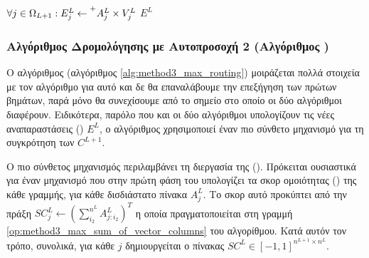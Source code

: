 {\begin{algorithm}[H]
\begin{algorithmic}[1]
      
    \State $\forall j \in \Omega_{L+1}: E^L_j \gets \prescript{+}{}{A_j^L} \times V_j^L$  \label{op:method3_sum_weighted_sum} %
    \State \Return $E^L$ 
    \EndProcedure

  \end{algorithmic}
  \end{algorithm}
}

\subsubsection{Αλγόριθμος Δρομολόγησης με Αυτο\textendash προσοχή 2 (Αλγόριθμος )}
Ο αλγόριθμος  (αλγόριθμος \ref{alg:method3_max_routing}) μοιράζεται πολλά στοιχεία με τον αλγόριθμο  για αυτό και δε θα επαναλάβουμε την επεξήγηση των πρώτων βημάτων, παρά μόνο θα συνεχίσουμε από το σημείο στο οποίο οι δύο αλγόριθμοι διαφέρουν. Ειδικότερα, παρόλο που και οι δύο αλγόριθμοι υπολογίζουν τις νέες αναπαραστάσεις () $E^L$, ο αλγόριθμος  χρησιμοποιεί έναν πιο σύνθετο μηχανισμό για τη συγκρότηση των $C^{L+1}$.\par

Ο πιο σύνθετος μηχανισμός περιλαμβάνει τη διεργασία της  (). Πρόκειται ουσιαστικά για έναν μηχανισμό που στην πρώτη φάση του υπολογίζει τα σκορ ομοιότητας () της κάθε γραμμής, για κάθε δισδιάστατο πίνακα $A_j^L$. Το σκορ αυτό προκύπτει από την πράξη $SC_j^L \gets (\sum_{i_2}^{n^L} A^L_{j:i_2})^T$ η οποία πραγματοποιείται στη γραμμή \ref{op:method3_max_sum_of_vector_columns} του αλγορίθμου. Κατά αυτόν τον τρόπο, συνολικά, για κάθε $j$ δημιουργείται ο πίνακας $SC^L \in [-1, 1]^{n^{L+1}\times n^L}$.\par

